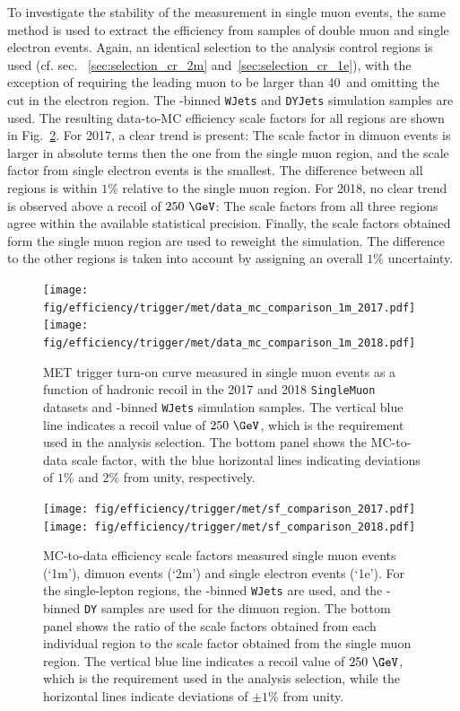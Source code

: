 To investigate the stability of the measurement in single muon events, the same method is used to extract the efficiency from samples of double muon and single electron events. Again, an identical selection to the analysis control regions is used (cf. sec. ~\ref{sec:selection_cr_2m} and~\ref{sec:selection_cr_1e}), with the exception of requiring the leading muon \pt to be larger than 40~\GeV and omitting the \ptmiss cut in the electron region. The \HT-binned \texttt{WJets} and \texttt{DYJets} simulation samples are used. The resulting data-to-MC efficiency scale factors for all regions are shown in Fig.~\ref{fig:hltsf_met}. For 2017, a clear trend is present: The scale factor in dimuon events is larger in absolute terms then the one from the single muon region, and the scale factor from single electron events is the smallest. The difference between all regions is within $1\%$ relative to the single muon region. For 2018, no clear trend is observed above a recoil of $250~\GeV$: The scale factors from all three regions agree within the available statistical precision. Finally, the scale factors obtained form the single muon region are used to reweight the simulation. The difference to the other regions is taken into account by assigning an overall $1\%$ uncertainty.

\begin{figure}[hbtp]\begin{center}
    \texttt{[image: fig/efficiency/trigger/met/data\_mc\_comparison\_1m\_2017.pdf]}
    \texttt{[image: fig/efficiency/trigger/met/data\_mc\_comparison\_1m\_2018.pdf]}
    \caption{MET trigger turn-on curve measured in single muon events as a function of hadronic recoil \pt in the 2017 and 2018 \texttt{SingleMuon} datasets and \HT-binned \texttt{WJets} simulation samples. The vertical blue line indicates a recoil value of $250~\GeV$, which is the requirement used in the analysis selection. The bottom panel shows the MC-to-data scale factor, with the blue horizontal lines indicating deviations of $1\%$ and $2\%$ from unity, respectively.}
    \label{fig:hlteff_met}
 \end{center}\end{figure}

\begin{figure}[hbtp]\begin{center}
    \texttt{[image: fig/efficiency/trigger/met/sf\_comparison\_2017.pdf]}
    \texttt{[image: fig/efficiency/trigger/met/sf\_comparison\_2018.pdf]}
    \caption{MC-to-data efficiency scale factors measured single muon events (`1m'), dimuon events (`2m') and single electron events (`1e'). For the single-lepton regions, the \HT-binned \texttt{WJets} are used, and the \HT-binned \texttt{DY} samples are used for the dimuon region. The bottom panel shows the ratio of the scale factors obtained from each individual region to the scale factor obtained from the single muon region. The vertical blue line indicates a recoil value of $250~\GeV$, which is the requirement used in the analysis selection, while the horizontal lines indicate deviations of $\pm1\%$ from unity.}
    \label{fig:hltsf_met}
 \end{center}\end{figure}



